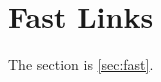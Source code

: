 \documentclass{article}
\begin{document}
\section{\texorpdfstring{Fast Links}{Fast links (PDF)}}\label{sec:fast}
The section  is \autoref{sec:fast}.
\end{document}
